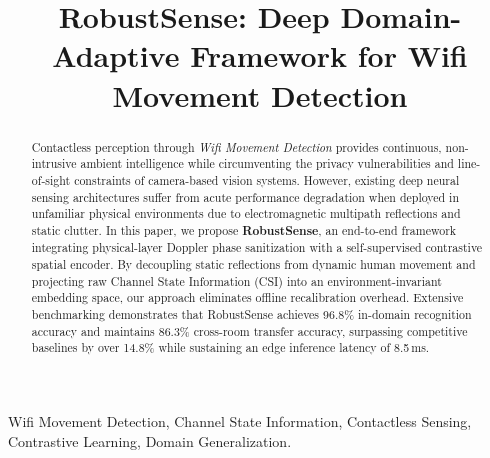 \documentclass[conference]{IEEEtran}
\begin{document}
\title{RobustSense: Deep Domain-Adaptive Framework for Wifi Movement Detection}

\author{
}

\maketitle

\begin{abstract}
Contactless perception through \textit{Wifi Movement Detection} provides continuous, non-intrusive ambient intelligence while circumventing the privacy vulnerabilities and line-of-sight constraints of camera-based vision systems. However, existing deep neural sensing architectures suffer from acute performance degradation when deployed in unfamiliar physical environments due to electromagnetic multipath reflections and static clutter. In this paper, we propose \textbf{RobustSense}, an end-to-end framework integrating physical-layer Doppler phase sanitization with a self-supervised contrastive spatial encoder. By decoupling static reflections from dynamic human movement and projecting raw Channel State Information (CSI) into an environment-invariant embedding space, our approach eliminates offline recalibration overhead. Extensive benchmarking demonstrates that RobustSense achieves 96.8\% in-domain recognition accuracy and maintains 86.3\% cross-room transfer accuracy, surpassing competitive baselines by over 14.8\% while sustaining an edge inference latency of 8.5\,ms.
\end{abstract}

\begin{IEEEkeywords}
Wifi Movement Detection, Channel State Information, Contactless Sensing, Contrastive Learning, Domain Generalization.
\end{IEEEkeywords}









\end{document}
